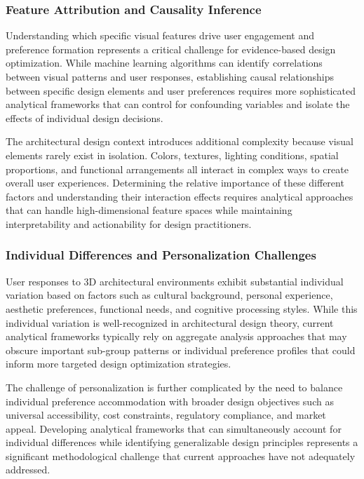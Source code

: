 \subsubsection{Feature Attribution and Causality Inference}
\label{subsubsec:feature_attribution}

Understanding which specific visual features drive user engagement and preference formation represents a critical challenge for evidence-based design optimization. While machine learning algorithms can identify correlations between visual patterns and user responses, establishing causal relationships between specific design elements and user preferences requires more sophisticated analytical frameworks that can control for confounding variables and isolate the effects of individual design decisions.

The architectural design context introduces additional complexity because visual elements rarely exist in isolation. Colors, textures, lighting conditions, spatial proportions, and functional arrangements all interact in complex ways to create overall user experiences. Determining the relative importance of these different factors and understanding their interaction effects requires analytical approaches that can handle high-dimensional feature spaces while maintaining interpretability and actionability for design practitioners.

\subsubsection{Individual Differences and Personalization Challenges}
\label{subsubsec:individual_differences}

User responses to 3D architectural environments exhibit substantial individual variation based on factors such as cultural background, personal experience, aesthetic preferences, functional needs, and cognitive processing styles. While this individual variation is well-recognized in architectural design theory, current analytical frameworks typically rely on aggregate analysis approaches that may obscure important sub-group patterns or individual preference profiles that could inform more targeted design optimization strategies.

The challenge of personalization is further complicated by the need to balance individual preference accommodation with broader design objectives such as universal accessibility, cost constraints, regulatory compliance, and market appeal. Developing analytical frameworks that can simultaneously account for individual differences while identifying generalizable design principles represents a significant methodological challenge that current approaches have not adequately addressed.

